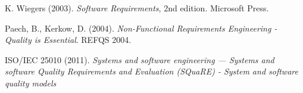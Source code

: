 {\begin{latin}
\begin{thebibliography}{9}
	
	K. Wiegers (2003). \textit{Software Requirements}, 2nd edition.
	Microsoft Press.
	
	Paech, B., Kerkow, D. (2004). \textit{Non-Functional Requirements Engineering - Quality is Essential}.
	REFQS 2004.


	ISO/IEC 25010 (2011).\textit{ Systems and software engineering — Systems and software Quality Requirements and Evaluation (SQuaRE) - System and software quality models}
	
	
	
\end{thebibliography}
\endgroup
\end{latin}

}
